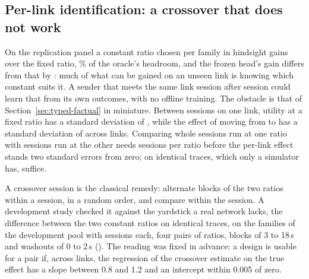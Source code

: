 \documentclass[10pt]{article}
\begin{document}
\subsection{Per-link identification: a crossover that does not work}
\label{sec:typed-crossover}
On the replication panel a constant ratio chosen per family in hindsight gains \TypedRepFamilyConstantGain{} over the fixed ratio, \TypedRepFamilyConstantShare\% of the oracle's headroom, and the frozen head's gain differs from that by \TypedRepHeadVsFamilyConstant{}: much of what can be gained on an unseen link is knowing which constant suits it. A sender that meets the same link session after session could learn that from its own outcomes, with no offline training. The obstacle is that of Section~\ref{sec:typed-factual} in miniature. Between sessions on one link, utility at a fixed ratio has a standard deviation of \TypedCrossBetweenSpread{}, while the effect of moving from \TypedCrossPrimaryA{} to \TypedCrossPrimaryB{} has a standard deviation of \TypedCrossPrimarySpread{} across links. Comparing whole sessions run at one ratio with sessions run at the other needs \TypedCrossPrimaryWhole{} sessions per ratio before the per-link effect stands two standard errors from zero; on identical traces, which only a simulator has, \TypedCrossPrimaryIdeal{} suffice.

A crossover session is the classical remedy: alternate blocks of the two ratios within a session, in a random order, and compare within the session. A development study checked it against the yardstick a real network lacks, the difference between the two constant ratios on identical traces, on the \TypedCrossLinks{} families of the development pool with \TypedCrossSessions{} sessions each, four pairs of ratios, blocks of 3 to 18\,s and washouts of 0 to 2\,s (). The reading was fixed in advance: a design is usable for a pair if, across links, the regression of the crossover estimate on the true effect has a slope between 0.8 and 1.2 and an intercept within 0.005 of zero.

\begin{table}[t]
\centering\small

\caption{Crossover estimates of a per-link ratio effect against the constant-ratio difference on identical traces (washout 1\,s; \TypedCrossLinks{} links, \TypedCrossSessions{} sessions each). Slope, intercept and correlation are across links. Sessions is the median number at which a link's effect stands two standard errors of the estimate from zero, over links whose true effect is at least 0.01.}\label{tab:followup-crossover}
\end{table}
\end{document}
